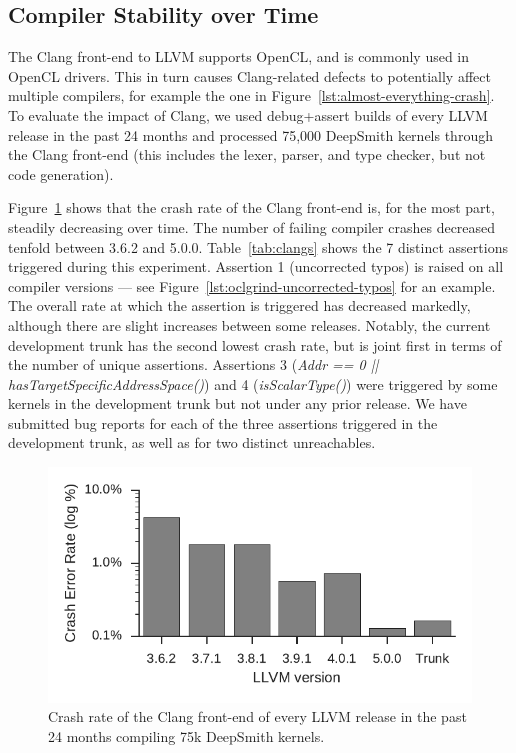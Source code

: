 \subsection{Compiler Stability over Time}%
\label{subsec:clangs}

The Clang front-end to LLVM supports OpenCL, and is commonly used in OpenCL drivers. This in turn causes Clang-related defects to potentially affect multiple compilers, for example the one in Figure~\ref{lst:almost-everything-crash}. To evaluate the impact of Clang, we used debug+assert builds of every LLVM release in the past 24 months and processed 75,000 DeepSmith kernels through the Clang front-end (this includes the lexer, parser, and type checker, but not code generation).

Figure~\ref{fig:clangs} shows that the crash rate of the Clang front-end is, for the most part, steadily decreasing over time. The number of failing compiler crashes decreased tenfold between 3.6.2 and 5.0.0.
Table~\ref{tab:clangs} shows the 7 distinct assertions triggered during this experiment. Assertion 1 (uncorrected typos) is raised on all compiler versions --- see Figure~\ref{lst:oclgrind-uncorrected-typos} for an example. The overall rate at which the assertion is triggered has decreased markedly, although there are slight increases between some releases. Notably, the current development trunk has the second lowest crash rate, but is joint first in terms of the number of unique assertions. Assertions 3 (\emph{Addr == 0 || hasTargetSpecificAddressSpace()}) and 4 (\emph{isScalarType()}) were triggered by some kernels in the development trunk but not under any prior release. We have submitted bug reports for each of the three assertions triggered in the development trunk, as well as for two distinct unreachables.

\begin{figure}
  \centering %
  \includegraphics[width=.95\columnwidth]{build/img/clang-crashes}%
  \caption{%
    Crash rate of the Clang front-end of every LLVM release in the past 24 months compiling 75k DeepSmith kernels.
  }%
  \label{fig:clangs} %
\end{figure}

